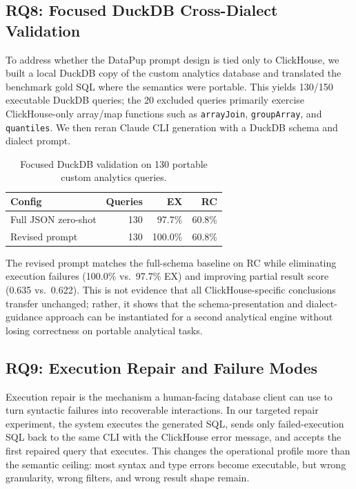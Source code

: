 \documentclass[sigconf, nonacm]{acmart}
\begin{document}
\subsection{RQ8: Focused DuckDB Cross-Dialect Validation}
\label{sec:duckdb}

To address whether the DataPup prompt design is tied only to ClickHouse, we built a local DuckDB copy of the custom analytics database and translated the benchmark gold SQL where the semantics were portable. This yields 130/150 executable DuckDB queries; the 20 excluded queries primarily exercise ClickHouse-only array/map functions such as \texttt{arrayJoin}, \texttt{groupArray}, and \texttt{quantiles}. We then reran Claude CLI generation with a DuckDB schema and dialect prompt.

\begin{table}[t]
\caption{Focused DuckDB validation on 130 portable custom analytics queries.}
\label{tab:duckdb}
\centering
\small
\begin{tabular}{lrrr}
\toprule
\textbf{Config} & \textbf{Queries} & \textbf{EX} & \textbf{RC} \\
\midrule
Full JSON zero-shot & 130 & 97.7\% & 60.8\% \\
Revised prompt & 130 & 100.0\% & 60.8\% \\
\bottomrule
\end{tabular}
\end{table}

The revised prompt matches the full-schema baseline on RC while eliminating execution failures (100.0\% vs.\ 97.7\% EX) and improving partial result score (0.635 vs.\ 0.622). This is not evidence that all ClickHouse-specific conclusions transfer unchanged; rather, it shows that the schema-presentation and dialect-guidance approach can be instantiated for a second analytical engine without losing correctness on portable analytical tasks.

\subsection{RQ9: Execution Repair and Failure Modes}
\label{sec:repair}

Execution repair is the mechanism a human-facing database client can use to turn syntactic failures into recoverable interactions. In our targeted repair experiment, the system executes the generated SQL, sends only failed-execution SQL back to the same CLI with the ClickHouse error message, and accepts the first repaired query that executes. This changes the operational profile more than the semantic ceiling: most syntax and type errors become executable, but wrong granularity, wrong filters, and wrong result shape remain.
\end{document}
